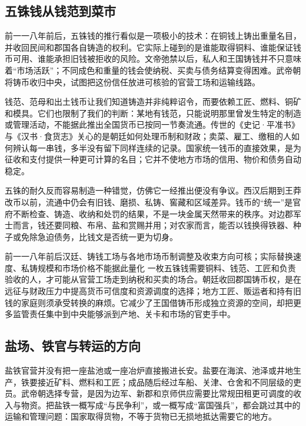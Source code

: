 \subsection{五铢钱从钱范到菜市}

前一一八年前后，五铢钱的推行看似是一项极小的技术：在铜钱上铸出重量名目，并收回民间和郡国各自铸造的权利。它实际上碰到的是谁能取得铜料、谁能保证钱币可用、谁能承担旧钱被拒收的风险。文帝弛禁以后，私人和王国铸钱并不只意味着“市场活跃”；不同成色和重量的钱会使纳税、买卖与债务结算变得困难。武帝朝将铸币收归中央，试图把这份信任放进可核验的官营工场和运输线路。

钱范、范母和出土钱币让我们知道铸造并非纯粹诏令，而要依赖工匠、燃料、铜矿和模具。它们也限制了我们的判断：某地有钱范，只能说明那里曾发生特定的制造或管理活动，不能据此推出全国货币已按同一节奏流通。传世的《史记·平准书》与《汉书·食货志》关心的是朝廷如何处理币制和财政；卖菜、雇工、缴租的人如何辨认每一串钱，多半没有留下同样连续的记录。国家统一钱币的直接效果，是为征收和支付提供一种更可计算的名目；它并不使地方市场的信用、物价和债务自动稳定。

五铢的耐久反而容易制造一种错觉，仿佛它一经推出便没有争议。西汉后期到王莽改币以前，流通中仍会有旧钱、磨损、私铸、窖藏和区域差异。钱币的“统一”是官府不断检查、铸造、收纳和处罚的结果，不是一块金属天然带来的秩序。对边郡军士而言，钱还要同粮、布帛、盐和赏赐并用；对农家而言，能否以钱换得铁器、种子或免除急迫债务，比钱文是否统一更为切身。

\begin{event}{}{前一一八年前后}{汉廷、铸钱工场与各地市场}{币制调整及收束方向可核；实际替换速度、私铸规模和市场价格不能据此量化}
一枚五铢钱需要铜料、钱范、工匠和负责验收的人，才可能从官营工场走到纳税和买卖的场合。朝廷收回郡国铸币权，是在远征与财政压力中提高货币可信度和资源调度的选择；地方工匠、贩运者和持有旧钱的家庭则须承受转换的麻烦。它减少了王国借铸币形成独立资源的空间，却把更多监管责任集中到中央能够派到产地、关卡和市场的官吏手中。
\end{event}

\subsection{盐场、铁官与转运的方向}

盐铁官营并没有把一座盐池或一座冶炉直接搬进长安。盐要在海滨、池泽或井地生产，铁要接近矿料、燃料和工匠；成品随后经过车船、关津、仓舍和不同层级的吏员。武帝朝选择专营，是因为边军、新郡和京师供应需要比常规田租更可调度的收入与物资。把盐铁一概写成“与民争利”，或一概写成“富国强兵”，都会跳过其中的运输和管理问题：国家取得货物，不等于货物已无损地抵达需要它的地方。

